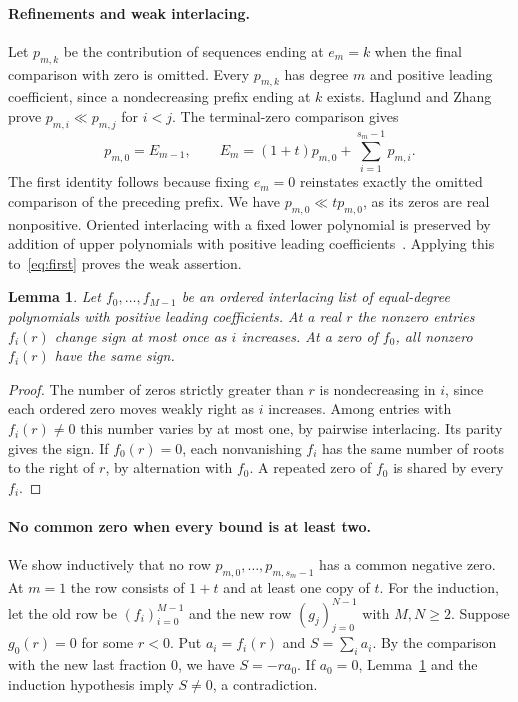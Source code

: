 \documentclass[11pt]{article}
\newtheorem{lemma}{Lemma}
\begin{document}
\paragraph{Refinements and weak interlacing.}
Let $p_{m,k}$ be the contribution of sequences ending at $e_m=k$ when the final comparison with zero is omitted. Every $p_{m,k}$ has degree $m$ and positive leading coefficient, since a nondecreasing prefix ending at $k$ exists. Haglund and Zhang~\cite[Theorem~1.1]{HZ} prove $p_{m,i}\ll p_{m,j}$ for $i<j$. The terminal-zero comparison gives
\begin{equation}\label{eq:first}
 p_{m,0}=E_{m-1},\qquad
 E_m=(1+t)p_{m,0}+\sum_{i=1}^{s_m-1}p_{m,i}.
\end{equation}
The first identity follows because fixing $e_m=0$ reinstates exactly the omitted comparison of the preceding prefix. We have $p_{m,0}\ll t p_{m,0}$, as its zeros are real nonpositive. Oriented interlacing with a fixed lower polynomial is preserved by addition of upper polynomials with positive leading coefficients~\cite[Lemma~2.3]{HZ}. Applying this to~\eqref{eq:first} proves the weak assertion.

\begin{lemma}\label{sign}
Let $f_0,\ldots,f_{M-1}$ be an ordered interlacing list of equal-degree polynomials with positive leading coefficients. At a real $r$ the nonzero entries $f_i(r)$ change sign at most once as $i$ increases. At a zero of $f_0$, all nonzero $f_i(r)$ have the same sign.
\end{lemma}
\begin{proof}
The number of zeros strictly greater than $r$ is nondecreasing in $i$, since each ordered zero moves weakly right as $i$ increases. Among entries with $f_i(r)\ne0$ this number varies by at most one, by pairwise interlacing. Its parity gives the sign. If $f_0(r)=0$, each nonvanishing $f_i$ has the same number of roots to the right of $r$, by alternation with $f_0$. A repeated zero of $f_0$ is shared by every $f_i$.
\end{proof}

\paragraph{No common zero when every bound is at least two.}
We show inductively that no row $p_{m,0},\ldots,p_{m,s_m-1}$ has a common negative zero. At $m=1$ the row consists of $1+t$ and at least one copy of $t$. For the induction, let the old row be $(f_i)_{i=0}^{M-1}$ and the new row $(g_j)_{j=0}^{N-1}$ with $M,N\ge2$. Suppose $g_0(r)=0$ for some $r<0$. Put $a_i=f_i(r)$ and $S=\sum_i a_i$. By the comparison with the new last fraction $0$, we have $S=-r a_0$. If $a_0=0$, Lemma~\ref{sign} and the induction hypothesis imply $S\ne0$, a contradiction.
\end{document}
